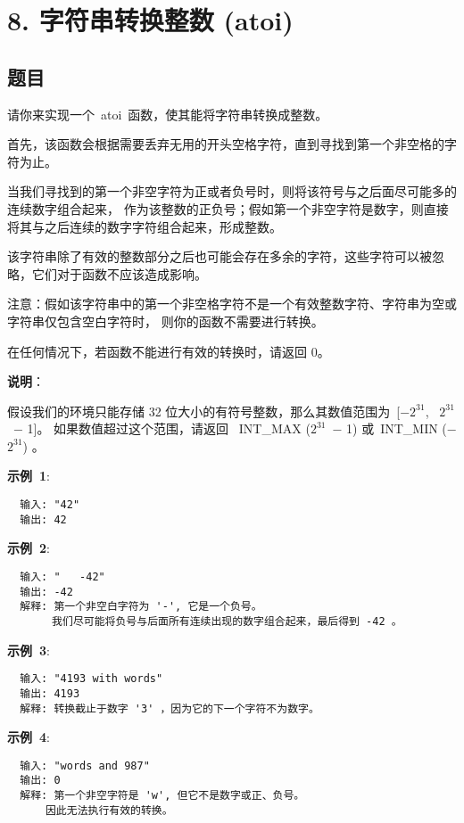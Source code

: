 \newpage
\section{8. 字符串转换整数 (atoi)}
\label{leetcode:8}

\subsection{题目}

请你来实现一个 atoi 函数，使其能将字符串转换成整数。

首先，该函数会根据需要丢弃无用的开头空格字符，直到寻找到第一个非空格的字符为止。

当我们寻找到的第一个非空字符为正或者负号时，则将该符号与之后面尽可能多的连续数字组合起来，
作为该整数的正负号；假如第一个非空字符是数字，则直接将其与之后连续的数字字符组合起来，形成整数。

该字符串除了有效的整数部分之后也可能会存在多余的字符，这些字符可以被忽略，它们对于函数不应该造成影响。

注意：假如该字符串中的第一个非空格字符不是一个有效整数字符、字符串为空或字符串仅包含空白字符时，
则你的函数不需要进行转换。

在任何情况下，若函数不能进行有效的转换时，请返回 0。

\textbf{说明}：

假设我们的环境只能存储 32 位大小的有符号整数，那么其数值范围为 [−$2^{31}$,  $2^{31}$ − 1]。
如果数值超过这个范围，请返回  INT\_MAX ($2^{31}$ − 1) 或 INT\_MIN (−$2^{31}$) 。

\textbf{示例 1}:

\begin{verbatim}
  输入: "42"
  输出: 42
\end{verbatim}

\textbf{示例 2}:

\begin{verbatim}
  输入: "   -42"
  输出: -42
  解释: 第一个非空白字符为 '-', 它是一个负号。
       我们尽可能将负号与后面所有连续出现的数字组合起来，最后得到 -42 。
\end{verbatim}

\textbf{示例 3}:

\begin{verbatim}
  输入: "4193 with words"
  输出: 4193
  解释: 转换截止于数字 '3' ，因为它的下一个字符不为数字。
\end{verbatim}

\textbf{示例 4}:

\begin{verbatim}
  输入: "words and 987"
  输出: 0
  解释: 第一个非空字符是 'w', 但它不是数字或正、负号。
      因此无法执行有效的转换。
\end{verbatim}

